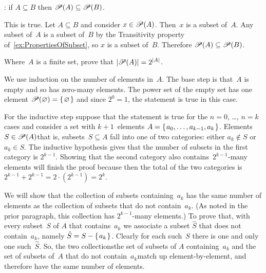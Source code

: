 \documentclass{ibl}  %
\begin{document}
\begin{problem} \pord:
if $A\subseteq B$ then $\mathscr{P}(A)\subseteq\mathscr{P}(B)$.  
\begin{answer}
This is true.
Let $A\subseteq B$ and consider $x\in\mathscr{P}(A)$.
Then~$x$ is a subset of~$A$.
Any subset of~$A$ is a subset of~$B$ by 
the Transitivity property of~\ref{ex:PropertiesOfSubset},
so $x$ is a subset of~$B$.
Therefore $\mathscr{P}(A)\subseteq\mathscr{P}(B)$.
\end{answer}
\end{problem}

\begin{problem}
Where~$A$ is a finite set, prove that $|\mathscr{P}(A)|=2^{|A|}$.    
\begin{answer}
We use induction on the number of elements in~$A$.
The base step is that~$A$ is empty and so has zero-many elements.
The power set of the empty set has
one element $\mathscr{P}(\varnothing)=\mbox{$\{\hspace{0.1em}\varnothing\hspace{0.1em}\}$}$ and
since $2^0=1$, the statement is true in this case. 

For the inductive step suppose that the statement is true for the 
$n=0$, \ldots, $n=k$ cases and consider a set
with $k+1$~elements
$A=\mbox{$\{\hspace{0.1em}a_0, \ldots, a_{k-1},a_k\hspace{0.1em}\}$}$.
Elements $S\in\mathscr{P}(A)$\Dash that is, subsets~$S\subseteq A$\Dash
fall into one of two categories: either $a_k\notin S$ or $a_k\in S$.
The inductive hypothesis gives that 
the number of subsets in the first category is $2^{k-1}$.
Showing that 
the second category also contains~$2^{k-1}$-many elements will finish the proof
because then
the total of the two categories is 
$2^{k-1}+2^{k-1}=2\cdot(2^{k-1})=2^k$.

We will show that the collection of subsets containing~$a_k$
has the same number of elements as the collection of subsets that do not
contain~$a_k$.
(As noted in the prior paragraph, this collection has $2^{k-1}$-many elements.)
To prove that, with every subset~$S$ of $A$ that contains~$a_k$ we associate
a subset $\hat{S}$ that does not contain~$a_k$,
namely $\hat{S}=S-\mbox{$\{\hspace{0.1em}a_k\hspace{0.1em}\}$}$.
Clearly for each such~$S$ there is one and only one such~$\hat{S}$.
So, the two collections\Dash the set of subsets of $A$ containing~$a_k$
and the set of subsets of~$A$ that do not contain~$a_k$\Dash match
up element-by-element, and therefore have the same number of elements.
\end{answer}
\end{problem}
\end{document}
